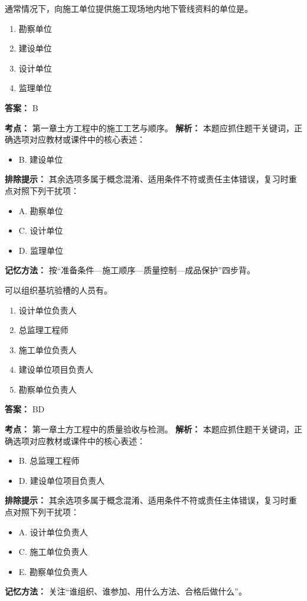 \documentclass[UTF8,fontset=fandol,11pt]{ctexart}
\begin{document}
\begin{quizbox}[title={第 23 题}]
通常情况下，向施工单位提供施工现场地内地下管线资料的单位是。\\
\begin{enumerate}[label=\Alph*.]
\item 勘察单位
\item 建设单位
\item 设计单位
\item 监理单位
\end{enumerate}
\textbf{答案：} B
\vspace{0.25em}
\begin{answerbox}[title={考点解析}]
\textbf{考点：} 第一章土方工程中的施工工艺与顺序。
\textbf{解析：} 本题应抓住题干关键词，正确选项对应教材或课件中的核心表述：
\begin{itemize}
\item B. 建设单位
\end{itemize}
\textbf{排除提示：} 其余选项多属于概念混淆、适用条件不符或责任主体错误，复习时重点对照下列干扰项：
\begin{itemize}
\item A. 勘察单位
\item C. 设计单位
\item D. 监理单位
\end{itemize}
\textbf{记忆方法：} 按“准备条件—施工顺序—质量控制—成品保护”四步背。
\end{answerbox}
\end{quizbox}

\begin{quizbox}[title={第 24 题}]
可以组织基坑验槽的人员有。\\
\begin{enumerate}[label=\Alph*.]
\item 设计单位负责人
\item 总监理工程师
\item 施工单位负责人
\item 建设单位项目负责人
\item 勘察单位负责人
\end{enumerate}
\textbf{答案：} BD
\vspace{0.25em}
\begin{answerbox}[title={考点解析}]
\textbf{考点：} 第一章土方工程中的质量验收与检测。
\textbf{解析：} 本题应抓住题干关键词，正确选项对应教材或课件中的核心表述：
\begin{itemize}
\item B. 总监理工程师
\item D. 建设单位项目负责人
\end{itemize}
\textbf{排除提示：} 其余选项多属于概念混淆、适用条件不符或责任主体错误，复习时重点对照下列干扰项：
\begin{itemize}
\item A. 设计单位负责人
\item C. 施工单位负责人
\item E. 勘察单位负责人
\end{itemize}
\textbf{记忆方法：} 关注“谁组织、谁参加、用什么方法、合格后做什么”。
\end{answerbox}
\end{quizbox}
\end{document}
